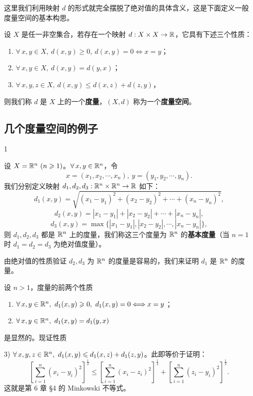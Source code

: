 这里我们利用映射 $d$ 的形式就完全摆脱了绝对值的具体含义，这是下面定义一般度量空间的基本构思。

\begin{mydef*}{}

设 $X$ 是任一非空集合，若存在一个映射 $d:X\times X\to\mathbb{R}$，它具有下述三个性质：

\begin{enumerate}[label=\arabic{enumi})]
\item $\forall\,x,y\in X,\ d(x,y)\geqslant0,\ d(x,y)=0\Longleftrightarrow x=y$；
\item $\forall\,x,y\in X,\ d(x,y)=d(y,x)$；
\item $\forall\,x,y,z\in X,\ d(x,y)\leqslant d(x,z)+d(z,y)$，
\end{enumerate}

则我们称 $d$ 是 $X$ 上的一个\textbf{度量}，$(X,d)$ 称为一个\textbf{度量空间}。

\end{mydef*}

\subsection{几个度量空间的例子}
	\label{sec:10-1-2}

\begin{sourceexample}{1}

设 $X=\mathbb{R}^n\ (n\geqslant1)$。$\forall\,x,y\in\mathbb{R}^n$，令
\[x=(x_1,x_2,\cdots,x_n),\ y=(y_1,y_2,\cdots,y_n).\]
我们分别定义映射 $d_1,d_2,d_3:\mathbb{R}^n\times\mathbb{R}^n\to\mathbb{R}$ 如下：
\[d_1(x,y)=\sqrt{(x_1-y_1)^2+(x_2-y_2)^2+\cdots+(x_n-y_n)^2},\]
\[d_2(x,y)=|x_1-y_1|+|x_2-y_2|+\cdots+|x_n-y_n|,\]
\[d_3(x,y)=\max\{|x_1-y_1|,|x_2-y_2|,\cdots,|x_n-y_n|\},\]
则 $d_1,d_2,d_3$ 都是 $\mathbb{R}^n$ 上的度量，我们称这三个度量为 $\mathbb{R}^n$ 的\textbf{基本度量}（当 $n=1$ 时 $d_1=d_2=d_3$ 为绝对值度量）。

由绝对值的性质验证 $d_2,d_3$ 为 $\mathbb{R}^n$ 的度量是容易的，我们来证明 $d_1$ 是 $\mathbb{R}^n$ 的度量。

设 $n>1$，度量的前两个性质

\begin{enumerate}[label=\arabic{enumi})]
\item $\forall\,x,y\in\R^n,\ d_1(x,y)\geqslant0,\ d_1(x,y)=0\Longleftrightarrow x=y$；
\item $\forall\,x,y\in\R^n,\ d_1(x,y)=d_1(y,x)$
\end{enumerate}

是显然的。现证性质

3) $\forall\,x,y,z\in\R^n,\ d_1(x,y)\leqslant d_1(x,z)+d_1(z,y)$。此即等价于证明：
\[\left[\sum_{i=1}^{n}(x_i-y_i)^2\right]^{\frac12}\leqslant\left[\sum_{i=1}^{n}(x_i-z_i)^2\right]^{\frac12}+\left[\sum_{i=1}^{n}(z_i-y_i)^2\right]^{\frac12}.\]
这就是第 6 章 §4 的 Minkowski 不等式。

\end{sourceexample}

